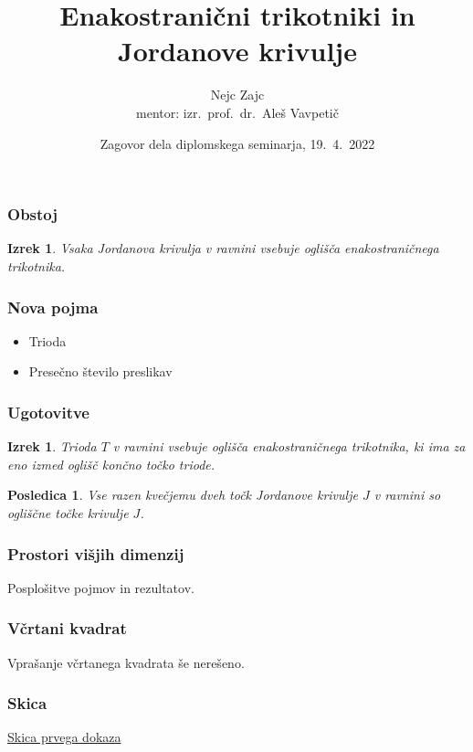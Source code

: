 \documentclass{beamer}
\title{Enakostranični trikotniki in Jordanove krivulje}
\author[Nejc Zajc]{Nejc Zajc \\ mentor: izr.~prof.~dr.~Aleš Vavpetič}
\date{Zagovor dela diplomskega seminarja, 19.\ 4.\ 2022}
\newtheorem{izrek}[theorem]{Izrek}
\newtheorem{posledica}[theorem]{Posledica}
\begin{document}
\begin{frame}
\maketitle

\end{frame}
\begin{frame}

\frametitle{Obstoj}
\pause
\begin{izrek}
Vsaka Jordanova krivulja v ravnini vsebuje oglišča enakostraničnega trikotnika.
\end{izrek}

\end{frame}
\begin{frame}

\frametitle{Nova pojma}
\pause
\begin{itemize}
\item Trioda
\pause
\item Presečno število preslikav
\end{itemize}

\end{frame}
\begin{frame}

\frametitle{Ugotovitve}
\begin{izrek}\label{izr:glavni}
Trioda $T$  v ravnini vsebuje oglišča enakostraničnega trikotnika, ki ima za eno izmed oglišč končno točko triode.
\end{izrek}
\pause
\begin{posledica}
Vse razen kvečjemu dveh točk Jordanove krivulje $J$ v ravnini so ogliščne točke krivulje $J$.
\end{posledica}

\end{frame}
\begin {frame}

\frametitle{Prostori višjih dimenzij}
Posplošitve pojmov in rezultatov.

\end{frame}
\begin {frame}

\frametitle{Včrtani kvadrat}
Vprašanje včrtanega kvadrata še nerešeno.

\end{frame}
\begin {frame}

\frametitle{Skica}
\href{https://www.geogebra.org/calculator/rjr5wbun}{Skica prvega dokaza} 

\end{frame}
\end{document}
